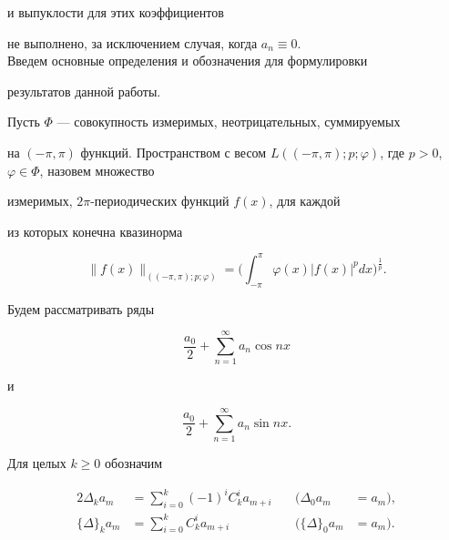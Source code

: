 и выпуклости для этих коэффициентов


не выполнено, за исключением случая, когда $a_{n} \equiv 0.$\\





Введем основные определения и обозначения для формулировки


результатов данной работы.


Пусть $\Phi$ --- совокупность измеримых, неотрицательных, суммируемых


на $(-\pi,\pi)$ функций. Пространством с весом $L((-\pi,\pi);p;


\varphi)$, где $p>0$, $\varphi \in \Phi$, назовем множество


измеримых, $2\pi$-периодических функций $f(x)$, для каждой


из которых конечна квазинорма


$$


\|f(x)\|_{((-\pi,\pi);p;\varphi)}=


\bigg(\int_{-\pi}^{\pi}\varphi(x)|f(x)|^p dx \bigg)^{\frac{1}{p}}.


$$





Будем рассматривать ряды


\begin{equation}


\frac{a_0}{2}+\sum\limits_{n=1}^{\infty} a_n\cos nx


\end{equation}


и


\begin{equation}


\frac{a_0}{2}+\sum\limits_{n=1}^{\infty} a_n\sin nx.


\end{equation}


Для целых $k\geq 0$ обозначим


\begin{alignat*}{2}


\Delta_k a_m&=\sum\limits_{i=0}^{k}(-1)^i C_k^i a_{m+i} &\quad 


(\Delta_0 a_m&=a_m), \\


%


\{ \Delta\}_k a_m &=\sum\limits_{i=0}^{k} C_k^i a_{m+i} &\quad 


(\{ \Delta\}_0a_m &=a_m).


\end{alignat*}


